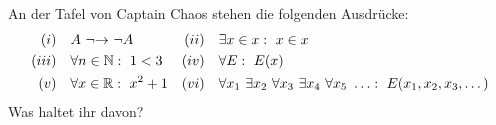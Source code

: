 \begin{aufg}[freestyle]
    An der Tafel von Captain Chaos stehen die folgenden Ausdrücke:
    \begin{align*}
        (i)\quad& A\ {\neg}{\to}\ \neg A&(ii)\quad& \exists x\in x:\ x\in x  \\
        (iii)\quad&   \forall n\in \N:\ 1<3 & (iv)\quad& \forall E :\ E(x) \\
        (v)\quad& \forall x\in \R :\ x^2+1 &(vi)\quad& \forall x_1\ \exists x_2\ \forall x_3\ \exists x_4\ \forall x_5\ \ldots:\ E(x_1,x_2,x_3,\dots)
    \end{align*}
    Was haltet ihr davon?
\end{aufg}

